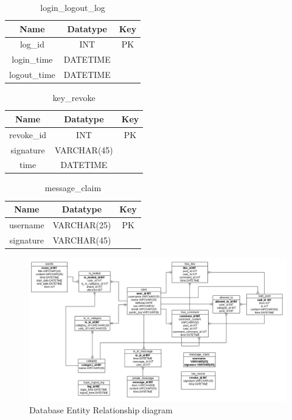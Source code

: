 \begin{table}[!ht]
\caption{login\_logout\_log}
\centering
\begin{tabular}{c c c}
\hline\hline
Name               & Datatype    & Key \\
\hline
log\_id            & INT         & PK  \\
login\_time        & DATETIME    &     \\
logout\_time       & DATETIME    &     \\
\hline
\end{tabular}
\label{table:nonlin}
\end{table}

\begin{table}[!ht]
\caption{key\_revoke}
\centering
\begin{tabular}{c c c}
\hline\hline
Name               & Datatype    & Key \\
\hline
revoke\_id         & INT          & PK  \\
signature          & VARCHAR(45)  &     \\
time               & DATETIME     &     \\
\hline
\end{tabular}
\label{table:nonlin}
\end{table}

\begin{table}[!ht]
\caption{message\_claim}
\centering
\begin{tabular}{c c c}
\hline\hline
Name               & Datatype    & Key \\
\hline
username           & VARCHAR(25) & PK  \\
signature          & VARCHAR(45) &     \\
\hline
\end{tabular}
\label{table:nonlin}
\end{table}

\clearpage

\begin{landscape}
\begin{figure}[h]
    
    \includegraphics[width=1.4\textwidth]{images/design/project_er_diagram.png}
    \caption{Database Entity Relationship diagram}
    \label{fig:db_er_diag}
\end{figure}
\end{landscape}
